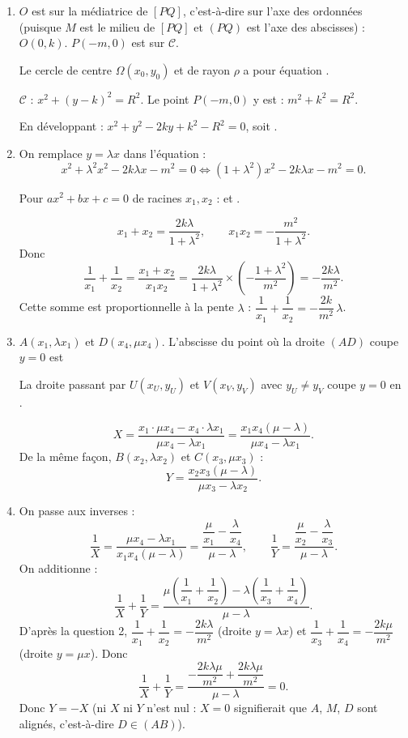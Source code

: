 \begin{enumerate}[itemsep=14pt]
  \item $O$ est sur la médiatrice de $[PQ]$, c'est-à-dire sur l'axe des ordonnées (puisque $M$ est le milieu de $[PQ]$ et $(PQ)$ est l'axe des abscisses) : $O(0,k)$. $P(-m,0)$ est sur $\mathcal C$.

  \begin{prop}
  Le cercle de centre $\Omega(x_0,y_0)$ et de rayon $\rho$ a pour équation .
  \end{prop}
  $\mathcal C$ : $x^2+(y-k)^2=R^2$. Le point $P(-m,0)$ y est : $m^2+k^2=R^2$.

  En développant : $x^2+y^2-2ky+k^2-R^2=0$, soit .

  \item On remplace $y=\lambda x$ dans l'équation :
  \[x^2+\lambda^2x^2-2k\lambda x-m^2=0\iff(1+\lambda^2)x^2-2k\lambda x-m^2=0.\]
  \begin{prop}
  Pour $ax^2+bx+c=0$ de racines $x_1,x_2$ :  et .
  \end{prop}
  \[x_1+x_2=\dfrac{2k\lambda}{1+\lambda^2},\qquad x_1x_2=-\dfrac{m^2}{1+\lambda^2}.\]
  Donc
  \[\dfrac1{x_1}+\dfrac1{x_2}=\dfrac{x_1+x_2}{x_1x_2}=\dfrac{2k\lambda}{1+\lambda^2}\times\left(-\dfrac{1+\lambda^2}{m^2}\right)=-\dfrac{2k\lambda}{m^2}.\]
  Cette somme est proportionnelle à la pente $\lambda$ : \textbf{$\dfrac1{x_1}+\dfrac1{x_2}=-\dfrac{2k}{m^2}\,\lambda$}.

  \item $A(x_1,\lambda x_1)$ et $D(x_4,\mu x_4)$. L'abscisse du point où la droite $(AD)$ coupe $y=0$ est
  \begin{prop}
  La droite passant par $U(x_U,y_U)$ et $V(x_V,y_V)$ avec $y_U\neq y_V$ coupe $y=0$ en .
  \end{prop}
  \[X=\dfrac{x_1\cdot\mu x_4-x_4\cdot\lambda x_1}{\mu x_4-\lambda x_1}=\dfrac{x_1x_4(\mu-\lambda)}{\mu x_4-\lambda x_1}.\]
  De la même façon, $B(x_2,\lambda x_2)$ et $C(x_3,\mu x_3)$ :
  \[Y=\dfrac{x_2x_3(\mu-\lambda)}{\mu x_3-\lambda x_2}.\]

  \item On passe aux inverses :
  \[\dfrac1X=\dfrac{\mu x_4-\lambda x_1}{x_1x_4(\mu-\lambda)}=\dfrac{\dfrac\mu{x_1}-\dfrac\lambda{x_4}}{\mu-\lambda},\qquad\dfrac1Y=\dfrac{\dfrac\mu{x_2}-\dfrac\lambda{x_3}}{\mu-\lambda}.\]
  On additionne :
  \[\dfrac1X+\dfrac1Y=\dfrac{\mu\left(\dfrac1{x_1}+\dfrac1{x_2}\right)-\lambda\left(\dfrac1{x_3}+\dfrac1{x_4}\right)}{\mu-\lambda}.\]
  D'après la question 2, $\dfrac1{x_1}+\dfrac1{x_2}=-\dfrac{2k\lambda}{m^2}$ (droite $y=\lambda x$) et $\dfrac1{x_3}+\dfrac1{x_4}=-\dfrac{2k\mu}{m^2}$ (droite $y=\mu x$). Donc
  \[\dfrac1X+\dfrac1Y=\dfrac{-\dfrac{2k\lambda\mu}{m^2}+\dfrac{2k\lambda\mu}{m^2}}{\mu-\lambda}=0.\]
  Donc $Y=-X$ (ni $X$ ni $Y$ n'est nul : $X=0$ signifierait que $A$, $M$, $D$ sont alignés, c'est-à-dire $D\in(AB)$).


\end{enumerate}
